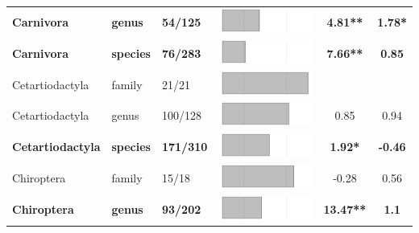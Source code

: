 \begin{longtable}{lL{1.8cm}C{2cm}lcc}
  \textbf{Carnivora} & \textbf{genus} & \textbf{54/125} & \includegraphics[width=0.20\linewidth, height=0.05\linewidth]{Supplementaries/Figures/MissingMammals/Results_1c/Table_figures/bar5.pdf} & \textbf{4.81**} & \textbf{1.78*} \\ 
  \textbf{Carnivora} & \textbf{species} & \textbf{76/283} & \includegraphics[width=0.20\linewidth, height=0.05\linewidth]{Supplementaries/Figures/MissingMammals/Results_1c/Table_figures/bar6.pdf} & \textbf{7.66**} & \textbf{0.85} \\ 
  Cetartiodactyla & family & 21/21 & \includegraphics[width=0.20\linewidth, height=0.05\linewidth]{Supplementaries/Figures/MissingMammals/Results_1c/Table_figures/bar7.pdf} &   &   \\ 
  Cetartiodactyla & genus & 100/128 & \includegraphics[width=0.20\linewidth, height=0.05\linewidth]{Supplementaries/Figures/MissingMammals/Results_1c/Table_figures/bar8.pdf} & 0.85 & 0.94 \\ 
  \textbf{Cetartiodactyla} & \textbf{species} & \textbf{171/310} & \includegraphics[width=0.20\linewidth, height=0.05\linewidth]{Supplementaries/Figures/MissingMammals/Results_1c/Table_figures/bar9.pdf} & \textbf{1.92*} & \textbf{-0.46} \\ 
  Chiroptera & family & 15/18 & \includegraphics[width=0.20\linewidth, height=0.05\linewidth]{Supplementaries/Figures/MissingMammals/Results_1c/Table_figures/bar10.pdf} & -0.28 & 0.56 \\ 
  \textbf{Chiroptera} & \textbf{genus} & \textbf{93/202} & \includegraphics[width=0.20\linewidth, height=0.05\linewidth]{Supplementaries/Figures/MissingMammals/Results_1c/Table_figures/bar11.pdf} & \textbf{13.47**} & \textbf{1.1} \\ 

\end{longtable}
